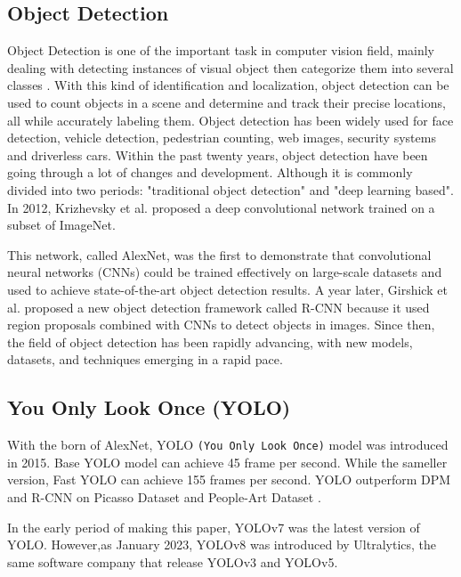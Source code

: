 \documentclass[conference]{IEEEtran}
\begin{document}
\subsection{Object Detection}
Object Detection is one of the important task in computer vision field, mainly dealing with detecting instances of visual object then categorize them into several classes \cite{b2}.
With this kind of identification and localization, object detection can be used to count objects in a scene and determine and track their precise locations, all while accurately labeling them.
Object detection has been widely used for face detection, vehicle detection, pedestrian counting, web images, security systems and driverless cars.
Within the past twenty years, object detection have been going through a lot of changes and development. Although it is commonly divided into two periods: "traditional object detection" and "deep learning based". In 2012, Krizhevsky et al. \cite{b3} proposed a deep convolutional network trained on a subset of ImageNet. 

This network, called AlexNet, was the first to demonstrate that convolutional neural networks (CNNs) could be trained effectively on large-scale datasets and used to achieve state-of-the-art object detection results.
A year later, Girshick et al. proposed a new object detection framework called R-CNN \cite{b4} because it used region proposals combined with CNNs to detect objects in images.
Since then, the field of object detection has been rapidly advancing, with new models, datasets, and techniques emerging in a rapid pace. 

\subsection{You Only Look Once (YOLO)}
With the born of AlexNet, YOLO \verb|(You Only Look Once)| model was introduced in 2015. Base YOLO model can achieve 45 frame per second. While the sameller version, Fast YOLO can achieve 155 frames per second.
YOLO outperform DPM and R-CNN on Picasso Dataset and People-Art Dataset \cite{b5}.

In the early period of making this paper, YOLOv7 was the latest version of YOLO. However,as January 2023, YOLOv8 was introduced by Ultralytics, the same software company that release YOLOv3 and YOLOv5. 
                                                                                                                                                                                                                                                                                                                                                                                                                                                                                                                    
\end{document}
